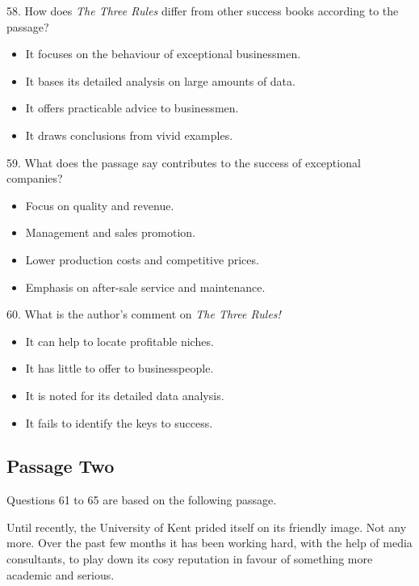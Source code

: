 \documentclass[UTF8,11pt]{ctexart}
\begin{document}
58. How does\textit{ The Three Rules} differ from other success books according to the passage?


\begin{itemize}[leftmargin=2em,itemsep=.2em,topsep=.4em]\item[A.] It focuses on the behaviour of exceptional businessmen.
\item[B.] It bases its detailed analysis on large amounts of data.
\item[C.] It offers practicable advice to businessmen.
\item[D.] It draws conclusions from vivid examples.
\end{itemize}

59. What does the passage say contributes to the success of exceptional companies?


\begin{itemize}[leftmargin=2em,itemsep=.2em,topsep=.4em]\item[A.] Focus on quality and revenue.
\end{itemize}

\begin{itemize}[leftmargin=2em,itemsep=.2em,topsep=.4em]\item[B.] Management and sales promotion.
\item[C.] Lower production costs and competitive prices.
\item[D.] Emphasis on after-sale service and maintenance.
\end{itemize}

60. What is the author’s comment on\textit{ The Three Rules!}


\begin{itemize}[leftmargin=2em,itemsep=.2em,topsep=.4em]\item[A.] It can help to locate profitable niches.
\item[B.] It has little to offer to businesspeople.
\item[C.] It is noted for its detailed data analysis.
\item[D.] It fails to identify the keys to success.
\end{itemize}

\subsection*{Passage Two}


Questions 61 to 65 are based on the following passage.


Until recently, the University of Kent prided itself on its friendly image. Not any more. Over the past few months it has been working hard, with the help of media consultants, to play down its cosy reputation in favour of something more academic and serious.
\end{document}
